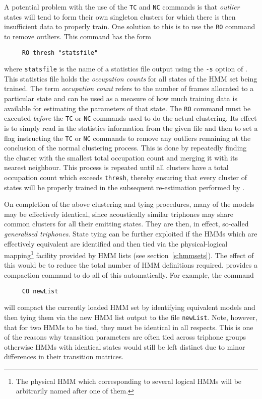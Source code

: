 A potential problem with the use of the \texttt{TC} and \texttt{NC} commands is
that {\it outlier} states will tend to form their own singleton 
clusters for
which there is then insufficient data to properly train.  One solution to
this is to use the \texttt{RO} command to 
remove outliers.  This command has
the form
\begin{verbatim}
     RO thresh "statsfile"
\end{verbatim}
where \texttt{statsfile} is the name of a statistics file output using the
\texttt{-s} option of .  This statistics file holds the 
{\em occupation counts} for all states of the HMM set being trained.  
The term {\em occupation count} refers to the number of frames allocated to a
particular state and can be used as a measure of how much training data is
available for estimating the parameters of that state.  
The \texttt{RO} command must be executed {\it before} the \texttt{TC} or
\texttt{NC} commands used to do the actual clustering. Its effect is to simply
read in the statistics information from the given file and then to set a flag
instructing the
\texttt{TC} or \texttt{NC} commands to remove any outliers remaining at 
the conclusion
of the normal clustering process.  This is done by repeatedly finding the
cluster with the smallest total occupation count and merging it with its
nearest neighbour. This process is repeated until all clusters have a total
occupation count which exceeds \texttt{thresh}, thereby ensuring that every
cluster of states will be properly trained in the subsequent re-estimation
performed by .


On completion of the above clustering and tying procedures, many of the models
may be effectively identical, since acoustically similar triphones may share
common clusters for all their emitting states.  They are then, in effect,
so-called {\it generalised triphones}. State tying
can be further exploited if the HMMs which are effectively equivalent are
identified and then tied via the physical-logical mapping\footnote{The physical
HMM which corresponding to several logical HMMs will be arbitrarily named after
one of them.} facility provided by HMM lists (see section~\ref{s:hmmsets}). The
effect of this would be to reduce the total number of HMM definitions required.
 provides a compaction command to do all of this automatically.
For example, the command
\begin{verbatim}
     CO newList 
\end{verbatim}
will compact 
the currently loaded HMM set by identifying equivalent models
and then tying them via the new HMM list output  to the 
file \texttt{newList}.  Note, however, that for two HMMs to be tied, they
must be identical in all respects.
This is one of the reasons why transition parameters are often tied
across triphone groups otherwise HMMs with identical states would still
be left distinct due to minor differences in their transition matrices.

